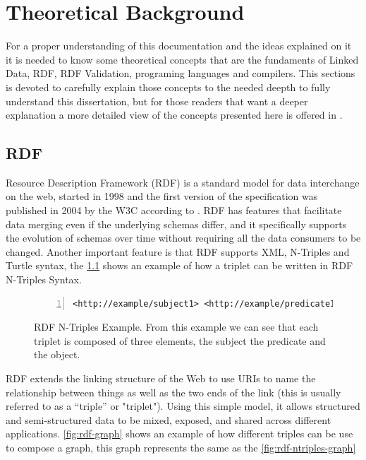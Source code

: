 \chapter{Theoretical Background}
\label{ch:theo-back}

For a proper understanding of this documentation and the ideas explained on it it is
needed to know some theoretical concepts that are the fundaments of Linked Data, RDF,
RDF Validation, programing languages and compilers. This sections is devoted to carefully
explain those concepts to the needed deepth to fully understand this dissertation, but for
those readers that want a deeper explanation a more detailed view of the concepts
presented here is offered in \cite{labra-validating-rdf, eric-rdf-validation-lang,
programing-language}.


\section{RDF}
\label{sec:theo-back-rdf}
Resource Description Framework (RDF) is a standard model for data interchange on the web,
started in 1998 and the first version of the specification was published in 2004 by the W3C
according to \cite{rdf-primer}. RDF has features that facilitate data merging even if the
underlying schemas differ, and it specifically supports the evolution of schemas over time
without requiring all the data consumers to be changed. Another important feature is that RDF
supports XML, N-Triples and Turtle syntax, the \cref{fig:rdf-ntriples-ex} shows an example of
how a triplet can be written in RDF N-Triples Syntax.

\begin{figure}
\begin{lstlisting}[numbers=left, basicstyle=\ttfamily\scriptsize]
<http://example/subject1> <http://example/predicate1> <http://example/object1> .
\end{lstlisting}
\caption[RDF N-Triples Example]{RDF N-Triples Example. From this example we can see that each triplet is
composed of three elements, the subject the predicate and the object.}
\label{fig:rdf-ntriples-ex}
\end{figure}

RDF extends the linking structure of the Web to use URIs to name the relationship between
things as well as the two ends of the link (this is usually referred to as a “triple” or "triplet").
Using this simple model, it allows structured and semi-structured data to be mixed, exposed,
and shared across different applications. \ref{fig:rdf-graph} shows an example of how different
triples can be use to compose a graph, this graph represents the same as the \cref{fig:rdf-ntriples-graph}

